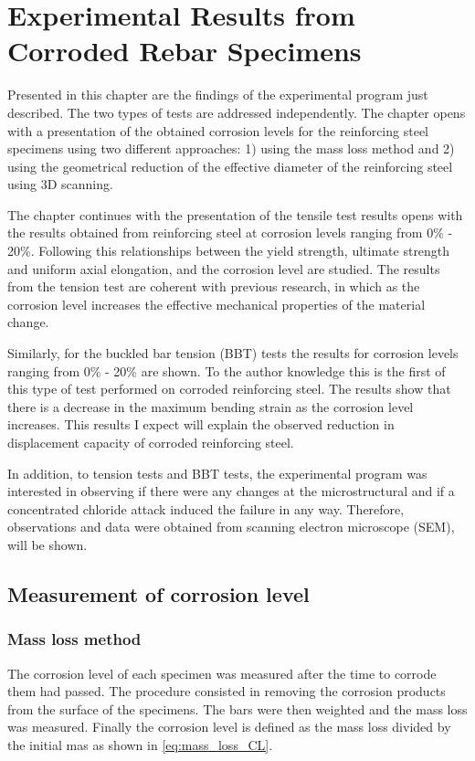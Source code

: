 \chapter{Experimental Results from Corroded Rebar Specimens}
Presented in this chapter are the findings of the experimental program just described. The two types of tests are addressed independently. The chapter opens with a presentation of the obtained corrosion levels for the reinforcing steel specimens using two different approaches: 1) using the mass loss method and 2) using the geometrical reduction of the effective diameter of the reinforcing steel using 3D scanning. 

The chapter continues with the presentation of the tensile test results opens with the results obtained from reinforcing steel at corrosion levels ranging from 0\% - 20\%. Following this relationships between the yield strength, ultimate strength and uniform axial elongation, and the corrosion level are studied. The results from the tension test are coherent with previous research, in which as the corrosion level increases the effective mechanical properties of the material change. 

Similarly, for the buckled bar tension (BBT) tests the results for corrosion levels ranging from 0\% - 20\% are shown. To the author knowledge this is the first of this type of test performed on corroded reinforcing steel. The results show that there is a decrease in the maximum bending strain as the corrosion level increases. This results I expect will explain the observed reduction in displacement capacity of corroded reinforcing steel. 

In addition, to tension tests and BBT tests, the experimental program was interested in observing if there were any changes at the microstructural and if a concentrated chloride attack induced the failure in any way. Therefore, observations and data were obtained from scanning electron microscope (SEM), will be shown.  

\section{Measurement of corrosion level}

\subsection{Mass loss method}

The corrosion level of each specimen was measured after the time to corrode them had passed. The procedure consisted in removing the corrosion products from the surface of the specimens. The bars were then weighted and the mass loss was measured. Finally the corrosion level is defined as the mass loss divided by the initial mas as shown in \ref{eq:mass_loss_CL}.

